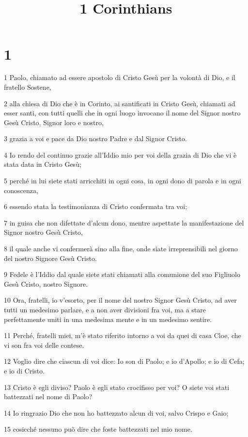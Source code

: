 

\title{1 Corinthians}


\chapter{1}

\par 1 Paolo, chiamato ad essere apostolo di Cristo Gesù per la volontà di Dio, e il fratello Sostene,
\par 2 alla chiesa di Dio che è in Corinto, ai santificati in Cristo Gesù, chiamati ad esser santi, con tutti quelli che in ogni luogo invocano il nome del Signor nostro Gesù Cristo, Signor loro e nostro,
\par 3 grazia a voi e pace da Dio nostro Padre e dal Signor Cristo.
\par 4 Io rendo del continuo grazie all'Iddio mio per voi della grazia di Dio che vi è stata data in Cristo Gesù;
\par 5 perché in lui siete stati arricchiti in ogni cosa, in ogni dono di parola e in ogni conoscenza,
\par 6 essendo stata la testimonianza di Cristo confermata tra voi;
\par 7 in guisa che non difettate d'alcun dono, mentre aspettate la manifestazione del Signor nostro Gesù Cristo,
\par 8 il quale anche vi confermerà sino alla fine, onde siate irreprensibili nel giorno del nostro Signore Gesù Cristo.
\par 9 Fedele è l'Iddio dal quale siete stati chiamati alla comunione del suo Figliuolo Gesù Cristo, nostro Signore.
\par 10 Ora, fratelli, io v'esorto, per il nome del nostro Signor Gesù Cristo, ad aver tutti un medesimo parlare, e a non aver divisioni fra voi, ma a stare perfettamente uniti in una medesima mente e in un medesimo sentire.
\par 11 Perché, fratelli miei, m'è stato riferito intorno a voi da quei di casa Cloe, che vi son fra voi delle contese.
\par 12 Voglio dire che ciascun di voi dice: Io son di Paolo; e io d'Apollo; e io di Cefa; e io di Cristo.
\par 13 Cristo è egli diviso? Paolo è egli stato crocifisso per voi? O siete voi stati battezzati nel nome di Paolo?
\par 14 Io ringrazio Dio che non ho battezzato alcun di voi, salvo Crispo e Gaio;
\par 15 cosicché nessuno può dire che foste battezzati nel mio nome.
